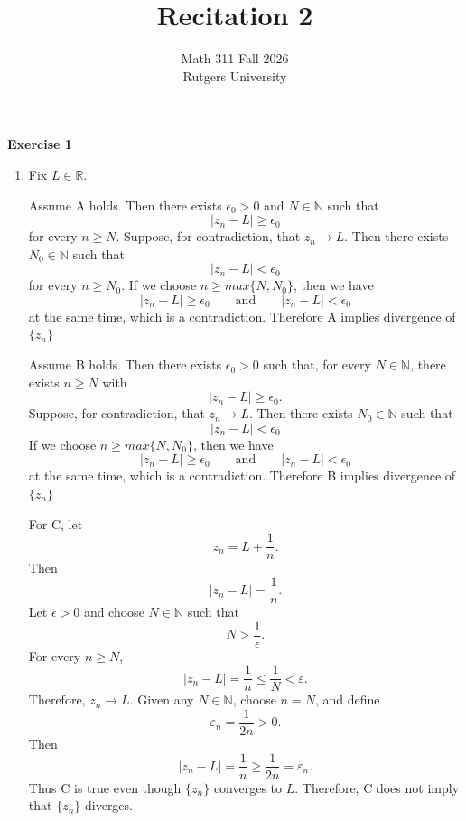 \documentclass[12pt]{article}
\title{Recitation 2}
\author{Math 311 Fall 2026 \\ Rutgers University}
\date{}
\begin{document}
\maketitle

\noindent{} \textbf{Exercise 1}

\begin{enumerate}
    \item [(a)] Fix $L \in \mathbb{R}$.

          Assume A holds.
          Then there exists $\epsilon_0 > 0$ and $N \in \mathbb{N}$ such that
          \[
              |z_n - L| \geq \epsilon_0
          \]
          for every $n \geq N$.
          Suppose, for contradiction, that $z_n \to L$.
          Then there exists $N_0 \in \mathbb{N}$ such that
          \[
              |z_n - L| < \epsilon_0
          \]
          for every $n \geq N_0$.
          If we choose $n \geq max\{N, N_0\}$, then we have
          \[
              |z_n - L| \geq \epsilon_0 \qquad \text{and} \qquad |z_n - L| < \epsilon_0
          \]
          at the same time, which is a contradiction.
          Therefore A implies divergence of $\{z_n\}$

          Assume B holds.
          Then there exists $\epsilon_0 > 0$ such that, for every $N \in \mathbb{N}$,
          there exists $n \geq N$ with
          \[
              |z_n - L| \geq \epsilon_0.
          \]
          Suppose, for contradiction, that $z_n \to L$.
          Then there exists $N_0 \in \mathbb{N}$ such that
          \[
              |z_n - L| < \epsilon_0
          \]
          If we choose $n \geq max\{N, N_0\}$, then we have
          \[
              |z_n - L| \geq \epsilon_0 \qquad \text{and} \qquad |z_n - L| < \epsilon_0
          \]
          at the same time, which is a contradiction.
          Therefore B implies divergence of $\{z_n\}$

          For C, let
          \[
              z_n=L+\frac1n.
          \]
          Then
          \[
              |z_n-L|=\frac1n.
          \]
          Let \(\epsilon>0\) and choose \(N\in\mathbb N\) such that
          \[
              N>\frac1\epsilon.
          \]
          For every \(n\geq N\),
          \[
              |z_n-L|=\frac1n\leq\frac1N<\varepsilon.
          \]
          Therefore, \(z_n\to L\).
          Given any \(N\in\mathbb N\), choose \(n=N\), and define
          \[
              \varepsilon_n=\frac{1}{2n}>0.
          \]Then
          \[
              |z_n-L|=\frac1n\geq\frac{1}{2n}=\varepsilon_n.
          \]Thus C is true even though \(\{z_n\}\) converges to \(L\). Therefore, C does not imply that \(\{z_n\}\) diverges.


\end{enumerate}
\end{document}
